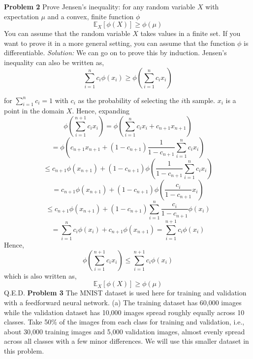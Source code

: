 \documentclass[12pt]{article}
\begin{document}
\textbf{Problem 2}  \newline  
Prove Jensen’s inequality: for any random variable $X$ with expectation $\mu$ and a convex, finite function $\phi$ 
$$ \mathbb{E}_{X} [\phi (X) ] \geq  \phi (\mu)    $$     
You can assume that the random variable $X$ takes values in a finite set. If you want to prove it in a more general setting, you can assume that the function $\phi$ is differentiable. \newline  \newline  
\emph{Solution:} 
\newline  
We can go on to prove this by induction.  Jensen's inequality can also be written as,   
$$ \sum_{i=1}^{n}   c_{i} \phi(x_{i}  )    \geq \phi ( \sum_{i=1}^{n}  c_{i} x_{i} )  $$

for $\sum_{i=1}^{n} c_{i} = 1$ with  $c_{i}$  as the probability of selecting the $i$th sample. $x_{i}$ is a point in the domain $X$. Hence, expanding 
$$ \phi (\sum_{i=1}^{n+1} c_{i} x_{i} )   =  \phi (\sum_{i=1}^{n} c_{i} x_{i}  + c_{n+1} x_{n+1}  )   $$ 
$$ = \phi(  c_{n+1} x_{n+1} + (1 -c_{n+1})\frac{1 }{1-c_{n+1} }  \sum_{i=1}^{n} c_{i} x_{i}  ) $$ 
$$ \leq  c_{n+1}  \phi (x_{n+1} )  +  ( 1-  c_{n+1} ) \phi (\frac{1}{1-c_{n+1} } \sum_{i=1}^{n} c_{i} x_{i}  )     $$ 
$$ = c_{n+1}  \phi (x_{n+1} )  + (1- c_{n+1}  ) \phi( \frac{c_{i} }{ 1-c_{n+1} } x_{i}  )     $$ 
$$ \leq  c_{n+1}  \phi (x_{n+1} ) + (1- c_{n+1} ) \sum_{i=1}^{n} \frac{c_{i} }{ 1-c_{n+1} } \phi (x_{i} )      $$ 
$$ =  \sum_{i =1}^{n} c_{i} \phi (x_{i})  + c_{n+1} \phi (x_{n+1})   =  \sum_{i =1}^{n+1} c_{i} \phi (x_{i})  $$
Hence,  
$$  \phi (\sum_{i=1}^{n+1} c_{i} x_{i} )   \leq \sum_{i =1}^{n+1} c_{i} \phi (x_{i})  $$ 
which is also written as,  
$$ \mathbb{E}_{X} [\phi (X) ] \geq  \phi (\mu)    $$      
Q.E.D. \newline   \newline  
\textbf{Problem 3}  \newline 
The MNIST dataset is used here for training and validation with a feedforward neural network.  \newline  
(a) The training dataset has 60,000 images while the validation dataset has 10,000 images spread roughly
equally across 10 classes. Take 50\% of the images from each class for training and validation, i.e.,
about 30,000 training images and 5,000 validation images, almost evenly spread across all classes
with a few minor differences. We will use this smaller dataset in this problem. \newline \newline 
\end{document}
